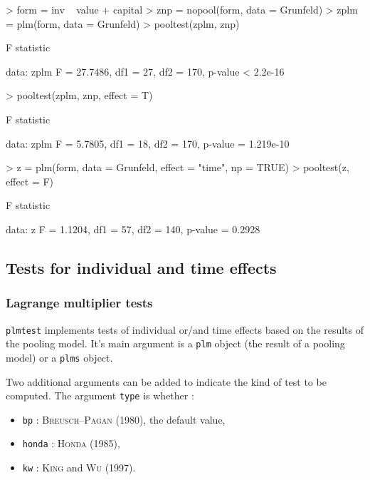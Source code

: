 \documentclass{article}
\begin{document}
\begin{Schunk}
\begin{Sinput}
> form = inv ~ value + capital
> znp = nopool(form, data = Grunfeld)
> zplm = plm(form, data = Grunfeld)
> pooltest(zplm, znp)
\end{Sinput}
\begin{Soutput}
	F statistic

data:  zplm 
F = 27.7486, df1 = 27, df2 = 170, p-value < 2.2e-16
\end{Soutput}
\begin{Sinput}
> pooltest(zplm, znp, effect = T)
\end{Sinput}
\begin{Soutput}
	F statistic

data:  zplm 
F = 5.7805, df1 = 18, df2 = 170, p-value = 1.219e-10
\end{Soutput}
\begin{Sinput}
> z = plm(form, data = Grunfeld, effect = "time", np = TRUE)
> pooltest(z, effect = F)
\end{Sinput}
\begin{Soutput}
	F statistic

data:  z 
F = 1.1204, df1 = 57, df2 = 140, p-value = 0.2928
\end{Soutput}
\end{Schunk}


\subsection{Tests for individual and time effects}



\subsubsection{Lagrange multiplier tests}

\texttt{plmtest} implements tests of individual or/and time effects  based on the results
of the pooling model. It's main argument is a
\texttt{plm} object (the result of a pooling model) or a
\texttt{plms} object.

Two additional arguments can be added to indicate the kind of test to
be computed. The argument \texttt{type} is whether :

\begin{itemize}
\item \texttt{bp} : \textsc{Breusch--Pagan} (1980), the default value,
\item \texttt{honda} : \textsc{Honda} (1985),
\item \texttt{kw} : \textsc{King} and \textsc{Wu} (1997).
\end{itemize}
\end{document}
